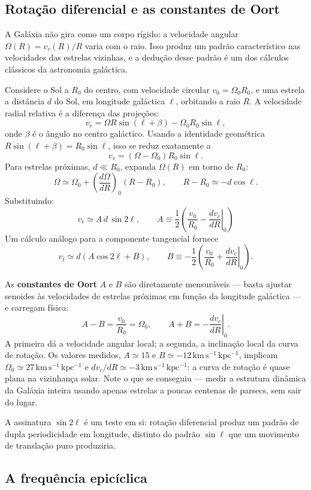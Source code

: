\documentclass[11pt,a4paper]{article}
\begin{document}
\subsection*{Rotação diferencial e as constantes de Oort}

A Galáxia não gira como um corpo rígido: a velocidade angular $\Omega(R)=v_c(R)/R$ varia com o raio. Isso produz um padrão característico nas velocidades das estrelas vizinhas, e a dedução desse padrão é um dos cálculos clássicos da astronomia galáctica.

Considere o Sol a $R_0$ do centro, com velocidade circular $v_0=\Omega_0R_0$, e uma estrela a distância $d$ do Sol, em longitude galáctica $\ell$, orbitando a raio $R$. A velocidade radial relativa é a diferença das projeções:
\[
v_r=\Omega R\sin(\ell+\beta)-\Omega_0R_0\sin\ell,
\]
onde $\beta$ é o ângulo no centro galáctico. Usando a identidade geométrica $R\sin(\ell+\beta)=R_0\sin\ell$, isso se reduz exatamente a
\[
v_r=\left(\Omega-\Omega_0\right)R_0\sin\ell.
\]
Para estrelas próximas, $d\ll R_0$, expanda $\Omega(R)$ em torno de $R_0$:
\[
\Omega\simeq\Omega_0+\left(\frac{d\Omega}{dR}\right)_0(R-R_0),
\qquad
R-R_0\simeq-d\cos\ell.
\]
Substituindo:
\[
\boxed{\ v_r\simeq A\,d\,\sin 2\ell,\qquad
A\equiv\frac{1}{2}\left(\frac{v_0}{R_0}-\left.\frac{dv_c}{dR}\right|_0\right)\ }
\]
Um cálculo análogo para a componente tangencial fornece
\[
v_t\simeq d\left(A\cos2\ell+B\right),
\qquad
B\equiv-\frac{1}{2}\left(\frac{v_0}{R_0}+\left.\frac{dv_c}{dR}\right|_0\right).
\]

As \textbf{constantes de Oort} $A$ e $B$ são diretamente mensuráveis --- basta ajustar senoides às velocidades de estrelas próximas em função da longitude galáctica --- e carregam física:
\[
A-B=\frac{v_0}{R_0}=\Omega_0,
\qquad
A+B=-\left.\frac{dv_c}{dR}\right|_0.
\]
A primeira dá a velocidade angular local; a segunda, a inclinação local da curva de rotação. Os valores medidos, $A\simeq15$ e $B\simeq-12\,\mathrm{km\,s^{-1}\,kpc^{-1}}$, implicam $\Omega_0\simeq27\,\mathrm{km\,s^{-1}\,kpc^{-1}}$ e $dv_c/dR\simeq-3\,\mathrm{km\,s^{-1}\,kpc^{-1}}$: a curva de rotação é quase plana na vizinhança solar. Note o que se conseguiu --- medir a estrutura dinâmica da Galáxia inteira usando apenas estrelas a poucas centenas de parsecs, sem sair do lugar.

A assinatura $\sin2\ell$ é um teste em si: rotação diferencial produz um padrão de dupla periodicidade em longitude, distinto do padrão $\sin\ell$ que um movimento de translação puro produziria.

\subsection*{A frequência epicíclica}
\end{document}
